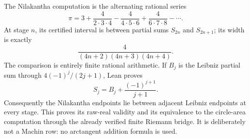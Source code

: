\begin{theorem}
\label{thm:nilakantha-pi}
The Nilakantha computation is the alternating rational series
\[
  \pi = 3 + \frac4{2\cdot3\cdot4}
    - \frac4{4\cdot5\cdot6}
    + \frac4{6\cdot7\cdot8}-\cdots.
\]
At stage \(n\), its certified interval is between partial sums \(S_{2n}\)
and \(S_{2n+1}\); its width is exactly
\[
  \frac4{(4n+2)(4n+3)(4n+4)}.
\]
The comparison is entirely finite rational arithmetic.  If \(B_j\) is the
Leibniz partial sum through \(4(-1)^j/(2j+1)\), Lean proves
\[
  S_j = B_j + \frac{(-1)^{j+1}}{j+1}.
\]
Consequently the Nilakantha endpoints lie between adjacent Leibniz endpoints
at every stage.  This proves its raw-real validity and its equivalence to the
circle-area computation through the already verified finite Riemann bridge.
It is deliberately not a Machin row: no arctangent addition formula is used.
\end{theorem}

